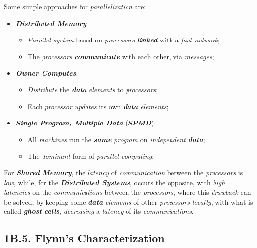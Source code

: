 \noindent Some simple approaches for \emph{parallelization} are:
\begin{itemize}
    \item \textbf{\emph{Distributed Memory}}:
    \vspace{-0.2cm}
    \begin{itemize}
        \item \emph{Parallel system} based on \emph{processors} \textbf{\emph{linked}} with a \emph{fast network};
        \item The \emph{processors} \textbf{\emph{communicate}} with each other, via \emph{messages};
    \end{itemize}
    \item \textbf{\emph{Owner Computes}}:
    \vspace{-0.2cm}
    \begin{itemize}
        \item \emph{Distribute} the \textbf{\emph{data}} \emph{elements} to \emph{processors};
        \item Each \emph{processor} \emph{updates} its own \textbf{\emph{data}} \emph{elements};
    \end{itemize}
    \item \textbf{\emph{Single Program, Multiple Data}} (\textbf{\emph{SPMD}}):
    \vspace{-0.2cm}
    \begin{itemize}
        \item All \emph{machines} run the \textbf{\emph{same}} \emph{program} on \emph{independent} \textbf{\emph{data}};
        \item The \emph{dominant} form of \emph{parallel computing};
    \end{itemize}
\end{itemize}

\noindent For \textbf{\emph{Shared Memory}}, the \emph{latency} of \emph{communication} between the \emph{processors} is \emph{low}, while, for the \textbf{\emph{Distributed Systems}}, occurs the opposite, with \emph{high} \emph{latencies} on the \emph{communications} between the \emph{processors}, where this \emph{drawback} can be solved, by keeping some \textbf{\emph{data}} \emph{elements} of other \emph{processors} \emph{locally}, with what is called \textbf{\emph{ghost cells}}, \emph{decreasing} a \emph{latency} of its \emph{communications}.

\newpage

\subsection*{\large{\textbf{1B.5. Flynn's Characterization}}}
\label{ssec:lecture-1B5}


